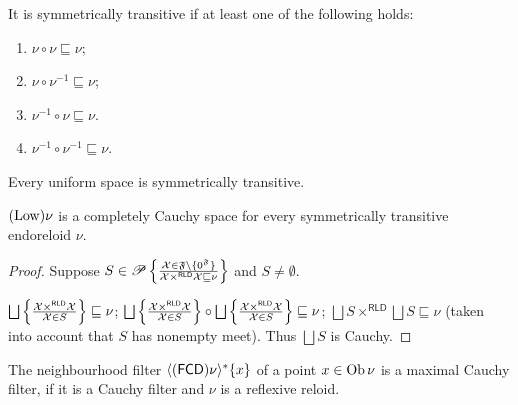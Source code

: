 \begin{obvious}
  It is symmetrically transitive if at least one of the following holds:
  \begin{enumerate}
    \item $\nu \circ \nu \sqsubseteq \nu$;
    
    \item $\nu \circ \nu^{- 1} \sqsubseteq \nu$;
    
    \item $\nu^{- 1} \circ \nu \sqsubseteq \nu$.
    
    \item $\nu^{- 1} \circ \nu^{- 1} \sqsubseteq \nu$.
  \end{enumerate}
\end{obvious}

\begin{cor}
  Every uniform space is symmetrically transitive.
\end{cor}

\begin{prop}
  $(\operatorname{Low}) \nu$ is a completely Cauchy space for every symmetrically
  transitive endoreloid $\nu$.
\end{prop}

\begin{proof}
  Suppose $S \in \mathscr{P} \left\{ \frac{ \mathcal{X} \in \mathfrak{F} \setminus \{
  0^{\mathfrak{F}} \}}{ \mathcal{X}
  \times^{\mathsf{RLD}} \mathcal{X} \sqsubseteq \nu }\right\}$ and $S
  \neq \emptyset$.
  
  $\bigsqcup \setcond{ \mathcal{X} \times^{\mathsf{RLD}} \mathcal{X}}
  {\mathcal{X} \in S } \sqsubseteq \nu$;
  $\bigsqcup \setcond{ \mathcal{X} \times^{\mathsf{RLD}} \mathcal{X}}
  {\mathcal{X} \in S } \circ \bigsqcup
  \setcond{ \mathcal{X} \times^{\mathsf{RLD}} \mathcal{X} }
  {\mathcal{X} \in S} \sqsubseteq \nu$; $\bigsqcup S
  \times^{\mathsf{RLD}} \bigsqcup S \sqsubseteq \nu$ (taken into
  account that $S$ has nonempty meet). Thus $\bigsqcup S$ is Cauchy.
\end{proof}

\begin{prop}
  The neighbourhood filter $\langle (\mathsf{FCD}) \nu \rangle^{\ast} \{
  x \}$ of a point $x \in \operatorname{Ob} \nu$ is a maximal Cauchy filter, if it is a
  Cauchy filter and $\nu$ is a reflexive reloid.
\end{prop}

